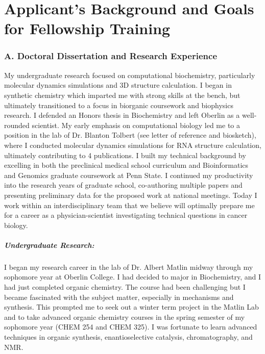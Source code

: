 \documentclass{NIHGrant}
\begin{document}
\part*{Applicant's Background and Goals for Fellowship Training}
\section*{A. Doctoral Dissertation and Research Experience}
My undergraduate research focused on computational biochemistry, particularly molecular dynamics simulations and 3D structure calculation. I began in synthetic chemistry which imparted me with strong skills at the bench, but ultimately transitioned to a focus in biorganic coursework and biophysics research. I defended an Honors thesis in Biochemistry and left Oberlin as a well-rounded scientist. My early emphasis on computational biology led me to a position in the lab of Dr. Blanton Tolbert (see letter of reference and biosketch), where I conducted molecular dynamics simulations for RNA structure calculation, ultimately contributing to 4 publications. I built my technical background by excelling in both the preclinical medical school curriculum and Bioinformatics and Genomics graduate coursework at Penn State. I continued my productivity into the research years of graduate school, co-authoring multiple papers and presenting preliminary data for the proposed work at national meetings. Today I work within an interdisciplinary team that we believe will optimally prepare me for a career as a physician-scientist investigating technical questions in cancer biology.

\subsubsection*{Undergraduate Research:}
I began my research career in the lab of Dr. Albert Matlin midway through my sophomore year at Oberlin College. I had decided to major in Biochemistry, and I had just completed organic chemistry. The course had been challenging but I became fascinated with the subject matter, especially in mechanisms and synthesis. This prompted me to seek out a winter term project in the Matlin Lab and to take advanced organic chemistry courses in the spring semester of my sophomore year (CHEM 254 and CHEM 325). I was fortunate to learn advanced techniques in organic synthesis, enantioselective catalysis, chromatography, and NMR.%
\end{document}
